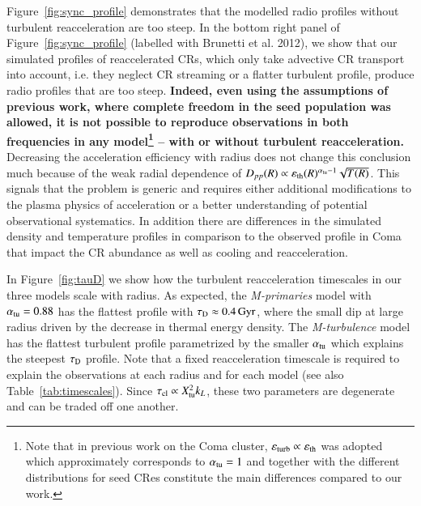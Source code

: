 \documentclass[fleqn,usenatbib,useAMS]{mnras}
\newcommand\C[1]{{\bf #1}}
\newcommand{\Mflatturb}{{\it M-turbulence}\xspace}
\newcommand{\Mprimary}{{\it M-primaries}\xspace}
\newcommand{\eps}{\varepsilon}
\begin{document}
Figure~\ref{fig:sync_profile} demonstrates that the modelled radio
profiles without turbulent reacceleration are too steep.  In the
bottom right panel of Figure~\ref{fig:sync_profile} (labelled with
Brunetti et al. 2012), we show that our simulated profiles of
reaccelerated CRs, which only take advective CR transport into
account, i.e. they neglect CR streaming or a flatter turbulent
profile, produce radio profiles that are too steep. \C{Indeed, even using
the assumptions of previous work, where complete freedom in the seed
population was allowed, it is not possible to reproduce observations
in both frequencies in any model\footnote{Note that in previous work
  on the Coma cluster, $\eps_\rmn{turb} \propto \eps_\rmn{th}$ was
  adopted which approximately corresponds to $\alpha_{\mathrm{tu}}= 1$
  \citep{brunetti12} and together with the different distributions for
  seed CRes constitute the main differences compared to our work.} -- with or without turbulent reacceleration.}
Decreasing the acceleration efficiency with radius does not change
this conclusion much because of the weak radial dependence of
$D_{pp}(R)\propto \eps_\rmn{th}(R)^{\alpha_\rmn{tu}-1}
\sqrt{T(R)}$. This signals that the problem is generic and requires
either additional modifications to the plasma physics of acceleration
or a better understanding of potential observational systematics. In
addition there are differences in the simulated density and
temperature profiles in comparison to the observed profile in Coma
that impact the CR abundance as well as cooling and reacceleration.

In Figure~\ref{fig:tauD} we show how the turbulent reacceleration
timescales in our three models scale with radius. As expected, the
\Mprimary model with $\alpha_{\mathrm{tu}}=0.88$ has the flattest profile
with $\tau_{\rm D}\approx0.4\,{\mathrm{Gyr}}$, where the small dip at large
radius driven by the decrease in thermal energy density. The
\Mflatturb model has the flattest turbulent profile parametrized
by the smaller $\alpha_{\mathrm{tu}}$ which explains the steepest $\tau_{\rm D}$
profile. Note that a fixed reacceleration timescale is required to
explain the observations at each radius and for each model (see also
Table~\ref{tab:timescales}). Since $\tau_{\mathrm{cl}} \propto X_{\mathrm{tu}}^2 k_L$,
these two parameters are degenerate and can be traded off one another.
\end{document}
